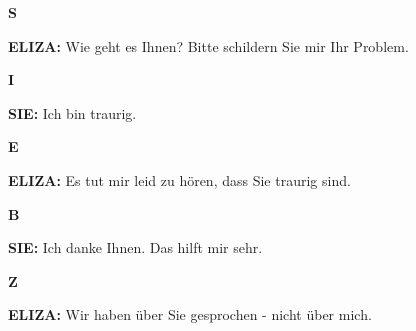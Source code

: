 \documentclass{article}
\begin{document}
\begin{minipage}[t]{0.13\textwidth}
  \centering
  {\bfseries\fontsize{14.4}{14.4}\selectfont\textcolor{pastelblue}{S}}
\end{minipage}%
\begin{minipage}[t]{0.81\textwidth}
  \textbf{ELIZA:} Wie geht es Ihnen? Bitte schildern Sie mir Ihr Problem.
\end{minipage}

\vspace{0.5cm}

\begin{minipage}[t]{0.13\textwidth}
  \centering
  {\bfseries\fontsize{14.4}{14.4}\selectfont\textcolor{pastelblue}{I}}
\end{minipage}%
\begin{minipage}[t]{0.81\textwidth}
  \textbf{SIE:} Ich bin traurig.
\end{minipage}

\vspace{0.5cm}

\begin{minipage}[t]{0.13\textwidth}
  \centering
  {\bfseries\fontsize{14.4}{14.4}\selectfont\textcolor{pastelblue}{E}}
\end{minipage}%
\begin{minipage}[t]{0.81\textwidth}
  \textbf{ELIZA:} Es tut mir leid zu hören, dass Sie traurig sind.
\end{minipage}

\vspace{0.5cm}

\begin{minipage}[t]{0.13\textwidth}
  \centering
  {\bfseries\fontsize{14.4}{14.4}\selectfont\textcolor{pastelblue}{B}}
\end{minipage}%
\begin{minipage}[t]{0.81\textwidth}
  \textbf{SIE:} Ich danke Ihnen. Das hilft mir sehr.
\end{minipage}

\vspace{0.5cm}

\begin{minipage}[t]{0.13\textwidth}
  \centering
  {\bfseries\fontsize{14.4}{14.4}\selectfont\textcolor{pastelblue}{Z}}
\end{minipage}%
\begin{minipage}[t]{0.81\textwidth}
  \textbf{ELIZA:} Wir haben über Sie gesprochen - nicht über mich.
\end{minipage}
\end{document}

